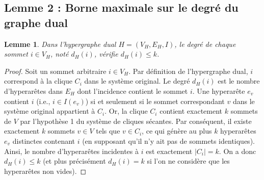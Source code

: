 \documentclass[12pt,a4paper]{article}
\newtheorem{lemma}{Lemme}
\begin{document}
\subsection{Lemme 2 : Borne maximale sur le degré du graphe dual}
\begin{lemma}
Dans l'hypergraphe dual $H = (V_H, E_H, I)$, le degré de chaque sommet $i \in V_H$, noté $d_H(i)$, vérifie $d_H(i) \le k$.
\end{lemma}
\begin{proof}
Soit un sommet arbitraire $i \in V_H$. Par définition de l'hypergraphe dual, $i$ correspond à la clique $C_i$ dans le système original.
Le degré $d_H(i)$ est le nombre d'hyperarêtes dans $E_H$ dont l'incidence contient le sommet $i$.
Une hyperarête $e_v$ contient $i$ (i.e., $i \in I(e_v)$) si et seulement si le sommet correspondant $v$ dans le système original appartient à $C_i$.
Or, la clique $C_i$ contient exactement $k$ sommets de $V$ par l'hypothèse 1 du système de cliques sécantes.
Par conséquent, il existe exactement $k$ sommets $v \in V$ tels que $v \in C_i$, ce qui génère au plus $k$ hyperarêtes $e_v$ distinctes contenant $i$ (en supposant qu'il n'y ait pas de sommets identiques).
Ainsi, le nombre d'hyperarêtes incidentes à $i$ est exactement $|C_i| = k$.
On a donc $d_H(i) \le k$ (et plus précisément $d_H(i) = k$ si l'on ne considère que les hyperarêtes non vides).
\end{proof}
\end{document}
